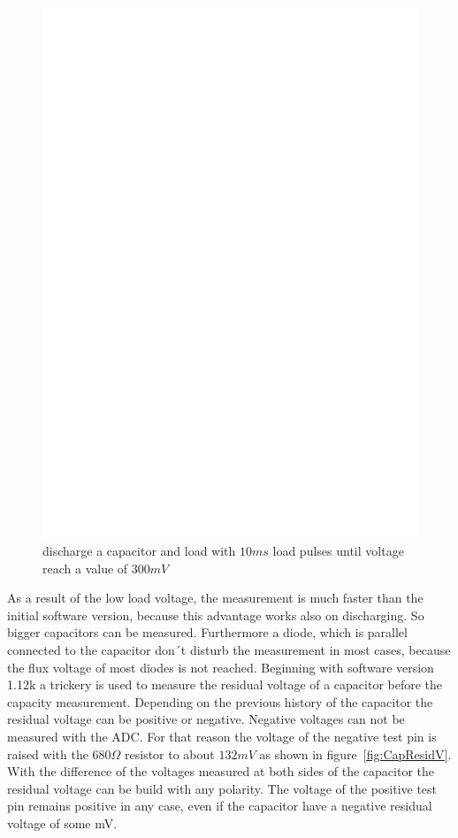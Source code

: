 \begin{figure}[H]
\centering
\includegraphics[]{../FIG/Bigcap.eps}
\caption{discharge a capacitor and load with \(10ms\) load pulses until voltage reach a value of \(300mV\)}
\label{fig:bigcap}
\end{figure}
As a result of the low load voltage, the measurement is much faster than the initial software version,
 because this advantage works also on discharging. So bigger capacitors can be measured.
Furthermore a diode, which is parallel connected to the capacitor don´t disturb the measurement in most cases,
because the flux voltage of most diodes is not reached.
Beginning with software version 1.12k a trickery is used to measure the residual voltage of a capacitor
before the capacity measurement. 
Depending on the previous history of the capacitor the residual voltage can be positive or negative.
Negative voltages can not be measured with the ADC. For that reason the voltage of the negative test pin
is raised with the \(680\Omega\) resistor to about \(132mV\) as shown in figure~\ref{fig:CapResidV}.
With the difference of the voltages measured at both sides of the capacitor the residual voltage can
be build with any polarity. The voltage of the positive test pin remains positive in any case, even if
the capacitor have a negative residual voltage of some mV.

